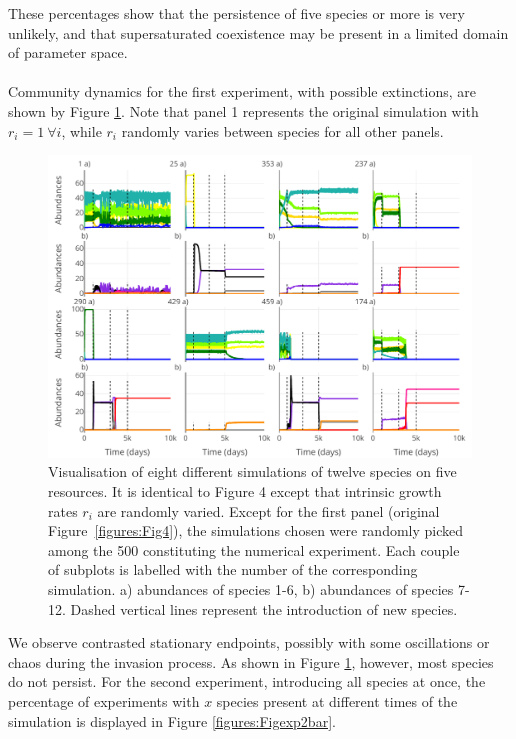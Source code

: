 These percentages show that the persistence of five species or more is very unlikely, and that supersaturated coexistence may be present in a limited domain of parameter space.\\
\\
Community dynamics for the first experiment, with possible extinctions, are shown by Figure \ref{figures:Figexp1}. Note that panel 1 represents the original simulation with $r_i=1 ~\forall i$, while $r_i$ randomly varies between species for all other panels. 

\begin{figure}[H]
\begin{center} 
 \includegraphics[width=1\textwidth]{../Code/Figures/Figure_exp1.pdf}
  \caption{Visualisation of eight different simulations of twelve species on five resources. It is identical to Figure 4 except that intrinsic growth rates $r_i$ are randomly varied. Except for the first panel (original Figure~\ref{figures:Fig4}), the simulations chosen were randomly picked among the 500 constituting the numerical experiment. Each couple of subplots is labelled with the number of the corresponding simulation. a) abundances of species 1-6, b) abundances of species 7-12. Dashed vertical lines represent the introduction of new species.}
  \label{figures:Figexp1}
\end{center}
\end{figure}

We observe contrasted stationary endpoints, possibly with some oscillations or chaos during the invasion process. As shown in Figure \ref{figures:Figexp1}, however, most species do not persist. For the second experiment, introducing all species at once, the percentage of experiments with $x$ species present at different times of the simulation is displayed in Figure \ref{figures:Figexp2bar}.\\

